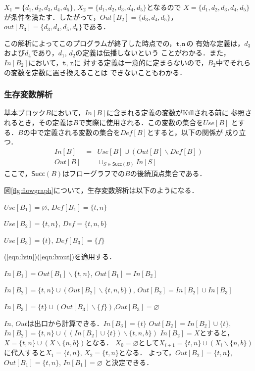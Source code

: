 \documentclass[dvipdfmx,a4j]{jbook}
\begin{document}
$X_1=\{d_1,d_2,d_3,d_4,d_5\}$, $X_2=\{d_1,d_2,d_3,d_4,d_5\}$となるので
$X=\{d_1,d_2,d_3,d_4,d_5\}$が条件を満たす．したがって，$Out[B_2]=\{d_3,d_4,d_5\}$，$out[B_3]=\{d_3,d_4,d_5,d_6\}$である．

この解析によってこのプログラムが終了した時点での，$\texttt{t},\texttt{n}$の
有効な定義は，$d_3$および$d_4$であり，$d_1$, $d_2$の定義は伝播しないという
ことがわかる．また，$In[B_2]$において，$\texttt{t}$, $\texttt{n}$に
対する定義は一意的に定まらないので，$B_2$中でそれらの変数を定数に置き換えることは
できないこともわかる．

\subsubsection{生存変数解析}

基本ブロック$B$において，$In[B]$に含まれる定義の変数がKillされる前に
参照されるとき，その定義は$B$で実際に使用される．この変数の集合を$Use[B]$
とする．$B$の中で定義される変数の集合を$Def[B]$とすると，以下の関係が
成り立つ．
\begin{eqnarray}
    In[B] & = & Use[B]\cup(Out[B]\backslash Def[B])\label{eqn:lvin}\\
    Out[B] & = & \cup_{S\in\mathsf{Succ}(B)}In[S]\label{eqn:lvout}
\end{eqnarray}
ここで，$\mathsf{Succ}(B)$はフローグラフでの$B$の後続頂点集合である．

図\ref{flg:flowgraph}について，生存変数解析は以下のようになる．
\begin{trivlist}
    \item $Use[B_1]=\varnothing$, $Def[B_1]=\{t,n\}$
    \item $Use[B_2]=\{t,n\}$, $Def=\{t,n,b\}$
    \item $Use[B_3]=\{t\}$, $Def[B_3]=\{f\}$
\end{trivlist}
(\ref{eqn:lvin})(\ref{eqn:lvout})を適用する．

\begin{trivlist}
    \item $In[B_1]=Out[B_1]\backslash\{t,n\}$, $Out[B_1]=In[B_2]$
    \item $In[B_2]=\{t,n\}\cup(Out[B_2]\backslash\{t,n,b\})$, $Out[B_2]=In[B_2]\cup In[B_3]$
    \item $In[B_3]=\{t\}\cup(Out[B_3]\backslash\{f\})$,$Out[B_3]=\varnothing$
\end{trivlist}

$In$, $Out$は出口から計算できる．$In[B_3]=\{t\}$
$Out[B_2]=In[B_2]\cup\{t\}$,
$In[B_2]=\{t,n\}\cup((In[B_2]\cup\{t\})\backslash\{t,n,b\})$
$In[B_2]=X$とすると，$X=\{t,n\}\cup(X\backslash\{n,b\})$となる．
$X_0=\varnothing$として$X_{i+1}=\{t,n\}\cup(X_i\backslash\{n,b\})$
に代入すると$X_1=\{t,n\}$, $X_2=\{t,n\}$となる．
よって，$Out[B_2]=\{t,n\}$, $Out[B_1]=\{t,n\}$, $In[B_1]=\varnothing$
と決定できる．
\end{document}
